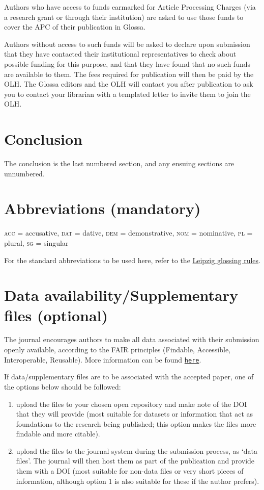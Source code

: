 \documentclass[charis,linguex]{glossa}
\begin{document}
Authors who have access to funds earmarked for Article Processing Charges (via a research grant or through their institution) are asked to use those funds to cover the APC of their publication in Glossa. 

Authors without access to such funds will be asked to declare upon submission that they have contacted their institutional representatives to check about possible funding for this purpose, and that they have found that no such funds are available to them. The fees required for publication will then be paid by the OLH. The Glossa editors and the OLH will contact you after publication to ask you to contact your librarian with a templated letter to invite them to join the OLH.

\section{Conclusion}

The conclusion is the last numbered section, and any ensuing sections are unnumbered.

\section*{Abbreviations (mandatory)}\label{abbrev}

\textsc{acc} = accusative, \textsc{dat} = dative, \textsc{dem} = demonstrative, \textsc{nom} = nominative, \textsc{pl} = plural, \textsc{sg} = singular

For the standard abbreviations to be used here, refer to the \href{https://www.eva.mpg.de/lingua/resources/glossing-rules.php}{Leipzig glossing rules}. 

\section*{Data availability/Supplementary files (optional)}

The journal encourages authors to make all data associated with their submission openly available, according to the FAIR principles (Findable, Accessible, Interoperable, Reusable). More information can be found \href{https://www.glossa-journal.org/about/editorialpolicies/#data-policy}{\texttt{here}}.

If data/supplementary files are to be associated with the accepted paper, one of the options below should be followed:
\begin{enumerate}
\item upload the files to your chosen open repository and make note of the DOI that they will provide (most suitable for datasets or information that act as foundations to the research being published; this option makes the files more findable and more citable).
\item upload the files to the journal system during the submission process, as `data files'. The journal will then host them as part of the publication and provide them with a DOI (most suitable for non-data files or very short pieces of information, although option 1 is also suitable for these if the author prefers).
\end{enumerate}
\end{document}
